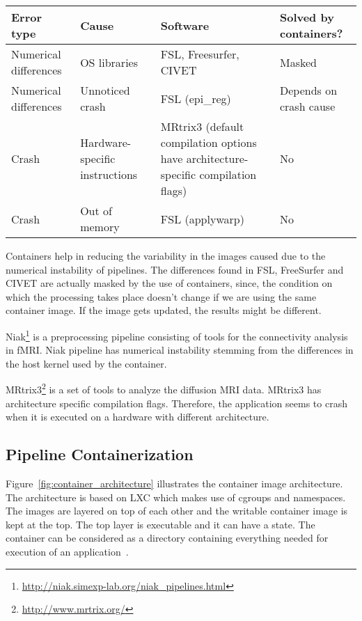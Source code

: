 \begin{center}
\tabulinesep=1.2mm
\begin{tabu} to \textwidth { | X[l] | X[l] | X[l] | X[l] |}
  \hline
  \textbf{Error type} & \textbf{Cause} & \textbf{Software} &  \textbf{Solved by containers?} \\
  \hline
  Numerical differences & OS libraries & FSL, Freesurfer, CIVET & Masked \\
  \hline
  Numerical differences & Unnoticed crash & FSL (epi\_reg) & Depends on crash cause \\
  \hline
  Crash & Hardware-specific instructions & MRtrix3 (default compilation options have architecture-specific compilation flags) & No \\
  \hline
  Crash & Out of memory & FSL (applywarp) & No \\
  \hline
\end{tabu}
\label{tab:table_docker}
\end{center}

Containers help in reducing the variability in the images caused due to the numerical instability of pipelines. The differences found in FSL, FreeSurfer and CIVET are actually masked by the use of containers, since, the condition on which the processing takes place doesn't change if we are using the same container image. If the image gets updated, the results might be different.

Niak\footnote{\url{http://niak.simexp-lab.org/niak\_pipelines.html}} is a preprocessing pipeline consisting of tools for the connectivity analysis in fMRI. Niak pipeline has numerical instability stemming from the differences in the host kernel used by the container. 

MRtrix3\footnote{\url{http://www.mrtrix.org/}} is a set of tools to analyze the diffusion MRI data. MRtrix3 has architecture specific compilation flags. Therefore, the application seems to crash when it is executed on a hardware with different architecture.

\subsection{Pipeline Containerization}
Figure~\ref{fig:container_architecture} illustrates the container image architecture. The architecture is based on LXC which makes use of cgroups and namespaces. The images are layered on top of each other and the writable container image is kept at the top. The top layer is executable and it can have a state. The container can be considered as a directory containing everything needed for execution of an application~\cite{7158965}.\\

